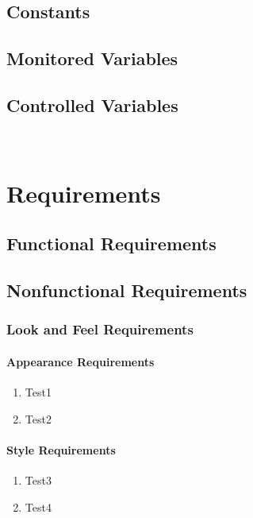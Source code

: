 \documentclass[12pt]{article}
\begin{document}
\subsection{Constants}
\subsection{Monitored Variables}
\subsection{Controlled Variables}

~\newpage

\section{Requirements}
\subsection{Functional Requirements}
\subsection{Nonfunctional Requirements}

\setcounter{vnvSectionNfr}{1}

\setcounter{nfrNum}{1}

\subsubsection{Look and Feel Requirements}

\paragraph{Appearance Requirements}
\begin{enumerate}[{LF}1., leftmargin=2\parindent]
    \item Test1
    \item Test2
\end{enumerate}

\paragraph{Style Requirements}
\begin{enumerate}[{LF}1., leftmargin=2\parindent, resume]
    \item Test3
    \item Test4
\end{enumerate}
\end{document}

